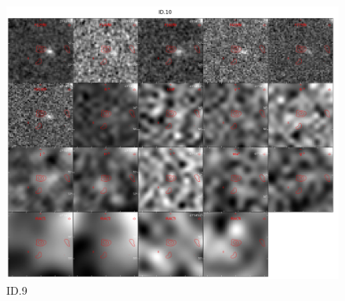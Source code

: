 \begin{figure}[tbp]
\centering \includegraphics[width=120mm]{Matched/ASPECS_Cutout_9.jpg}
\caption{ID.9}
\label{fig:Match_Three}
\end{figure}


